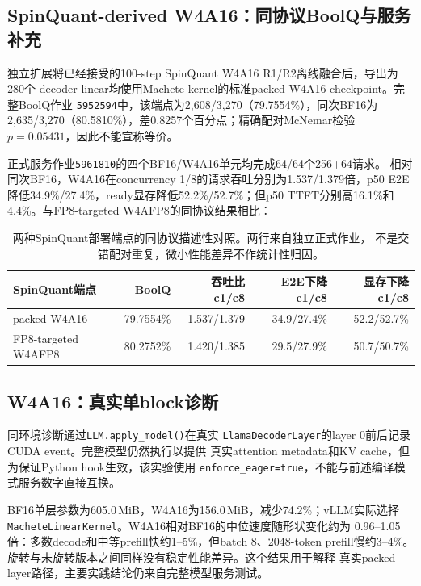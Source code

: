 \documentclass[11pt,a4paper]{ctexart}
\begin{document}
\subsection*{SpinQuant-derived W4A16：同协议BoolQ与服务补充}

独立扩展将已经接受的100-step SpinQuant W4A16 R1/R2离线融合后，导出为280个
decoder linear均使用Machete kernel的标准packed W4A16 checkpoint。完整BoolQ作业
\texttt{5952594}中，该端点为2,608/3,270（79.7554\%），同次BF16为
2,635/3,270（80.5810\%），差0.8257个百分点；精确配对McNemar检验
$p=0.05431$，因此不能宣称等价。

正式服务作业\texttt{5961810}的四个BF16/W4A16单元均完成64/64个256+64请求。
相对同次BF16，W4A16在concurrency 1/8的请求吞吐分别为1.537/1.379倍，p50 E2E
降低34.9\%/27.4\%，ready显存降低52.2\%/52.7\%；但p50 TTFT分别高16.1\%和
4.4\%。与FP8-targeted W4AFP8的同协议结果相比：

\begin{table}[htbp]
  \centering
  \small
  \begin{tabular}{@{}lrrrr@{}}
    \toprule
    SpinQuant端点 & BoolQ & 吞吐比c1/c8 & E2E下降c1/c8 & 显存下降c1/c8 \\
    \midrule
    packed W4A16 & 79.7554\% & 1.537/1.379 & 34.9/27.4\% & 52.2/52.7\% \\
    FP8-targeted W4AFP8 & 80.2752\% & 1.420/1.385 & 29.5/27.9\% & 50.7/50.7\% \\
    \bottomrule
  \end{tabular}
  \caption{两种SpinQuant部署端点的同协议描述性对照。两行来自独立正式作业，
  不是交错配对重复，微小性能差异不作统计性归因。}
\end{table}

\subsection*{W4A16：真实单block诊断}

同环境诊断通过\texttt{LLM.apply\_model()}在真实
\texttt{LlamaDecoderLayer}的layer 0前后记录CUDA event。完整模型仍然执行以提供
真实attention metadata和KV cache，但为保证Python hook生效，该实验使用
\texttt{enforce\_eager=true}，不能与前述编译模式服务数字直接互换。

BF16单层参数为605.0\,MiB，W4A16为156.0\,MiB，减少74.2\%；vLLM实际选择
\texttt{MacheteLinearKernel}。W4A16相对BF16的中位速度随形状变化约为
0.96--1.05倍：多数decode和中等prefill快约1--5\%，但batch 8、2048-token
prefill慢约3--4\%。旋转与未旋转版本之间同样没有稳定性能差异。这个结果用于解释
真实packed layer路径，主要实践结论仍来自完整模型服务测试。
\end{document}
